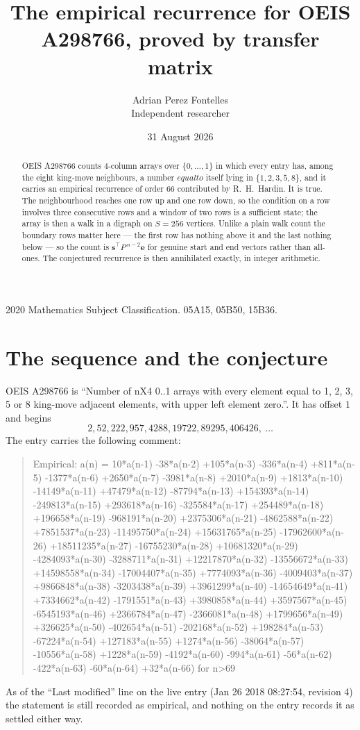 \documentclass[11pt,a4paper]{article}
\title{The empirical recurrence for OEIS A298766, proved by transfer matrix}
\author{Adrian Perez Fontelles\\ \small Independent researcher}
\date{31 August 2026}
\theoremstyle{plain}
\theoremstyle{definition}
\begin{document}
\maketitle

\begin{abstract}
OEIS A298766 counts $4$-column arrays over $\{0,\dots,1\}$ in which every entry has,
among the eight king-move neighbours, a number $equal to$ itself lying in $\{1,2,3,5,8\}$, and it carries an empirical
recurrence of order $66$ contributed by R.~H.~Hardin. It is true. The neighbourhood
reaches one row up and one row down, so the condition on a row involves three consecutive
rows and a window of two rows is a sufficient state; the array is then a walk in a digraph
on $S=256$ vertices. Unlike a plain walk count the boundary rows matter here --- the first
row has nothing above it and the last nothing below --- so the count is
$\mathbf{s}^{\!\top}P^{\,n-2}\mathbf{e}$ for genuine start and end vectors rather than
all-ones. The conjectured recurrence is then annihilated exactly, in integer arithmetic.
\end{abstract}

\noindent\small 2020 Mathematics Subject Classification. 05A15, 05B50, 15B36.\normalsize

\section{The sequence and the conjecture}

OEIS A298766 is ``Number of nX4 0..1 arrays with every element equal to 1, 2, 3, 5 or 8 king-move adjacent elements, with upper left element zero.''. It has offset
$1$ and begins
\[
2, 52, 222, 957, 4288, 19722, 89295, 406426,\ \dots
\]
The entry carries the following comment:
\begin{quote}\small
Empirical: a(n) = 10*a(n-1) -38*a(n-2) +105*a(n-3) -336*a(n-4) +811*a(n-5) -1377*a(n-6) +2650*a(n-7) -3981*a(n-8) +2010*a(n-9) +1813*a(n-10) -14149*a(n-11) +47479*a(n-12) -87794*a(n-13) +154393*a(n-14) -249813*a(n-15) +293618*a(n-16) -325584*a(n-17) +254489*a(n-18) +196658*a(n-19) -968191*a(n-20) +2375306*a(n-21) -4862588*a(n-22) +7851537*a(n-23) -11495750*a(n-24) +15631765*a(n-25) -17962600*a(n-26) +18511235*a(n-27) -16755230*a(n-28) +10681320*a(n-29) -4284093*a(n-30) -3288711*a(n-31) +12217870*a(n-32) -13556672*a(n-33) +14598558*a(n-34) -17004407*a(n-35) +7774093*a(n-36) -4009403*a(n-37) +9866848*a(n-38) -3203438*a(n-39) +3961299*a(n-40) -14654649*a(n-41) +7334662*a(n-42) -1791551*a(n-43) +3980858*a(n-44) +3597567*a(n-45) -6545193*a(n-46) +2366784*a(n-47) -2366081*a(n-48) +1799656*a(n-49) +326625*a(n-50) -402654*a(n-51) -202168*a(n-52) +198284*a(n-53) -67224*a(n-54) +127183*a(n-55) +1274*a(n-56) -38064*a(n-57) -10556*a(n-58) +1228*a(n-59) -4192*a(n-60) -994*a(n-61) -56*a(n-62) -422*a(n-63) -60*a(n-64) +32*a(n-66) for n>69
\end{quote}
As of the ``Last modified'' line on the live entry (Jan 26 2018 08:27:54, revision
4) the statement is still recorded as empirical, and nothing on the entry
records it as settled either way.
\end{document}
